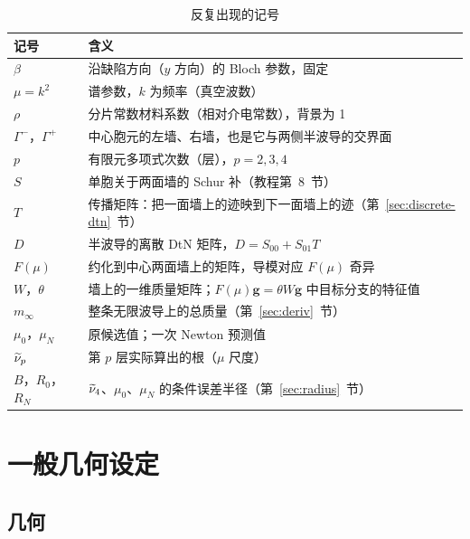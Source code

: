 \documentclass[11pt,a4paper,fontset=fandol]{ctexart}
\begin{document}
\begin{table}[ht]
\centering
\caption{反复出现的记号}
\label{tab:symbols}
\small
\begin{tabular}{>{\centering\arraybackslash}p{2.6cm}p{11cm}}
\toprule
记号 & 含义 \\
\midrule
$\beta$ & 沿缺陷方向（$y$ 方向）的 Bloch 参数，固定 \\
$\mu=k^2$ & 谱参数，$k$ 为频率（真空波数） \\
$\rho$ & 分片常数材料系数（相对介电常数），背景为 1 \\
$\Gamma^-$，$\Gamma^+$ & 中心胞元的左墙、右墙，也是它与两侧半波导的交界面 \\
$p$ & 有限元多项式次数（层），$p=2,3,4$ \\
$S$ & 单胞关于两面墙的 Schur 补（教程第~8~节） \\
$T$ & 传播矩阵：把一面墙上的迹映到下一面墙上的迹（第~\ref{sec:discrete-dtn}~节） \\
$D$ & 半波导的离散 DtN 矩阵，$D=S_{00}+S_{01}T$ \\
$F(\mu)$ & 约化到中心两面墙上的矩阵，导模对应 $F(\mu)$ 奇异 \\
$W$，$\theta$ & 墙上的一维质量矩阵；$F(\mu)\bm g=\theta W\bm g$ 中目标分支的特征值 \\
$m_\infty$ & 整条无限波导上的总质量（第~\ref{sec:deriv}~节） \\
$\mu_0$，$\mu_N$ & 原候选值；一次 Newton 预测值 \\
$\widetilde\nu_p$ & 第 $p$ 层实际算出的根（$\mu$ 尺度） \\
$B$，$R_0$，$R_N$ & $\widetilde\nu_4$、$\mu_0$、$\mu_N$ 的条件误差半径（第~\ref{sec:radius}~节） \\
\bottomrule
\end{tabular}
\end{table}

\section{一般几何设定}
\label{sec:setting}

\subsection{几何}
\end{document}
